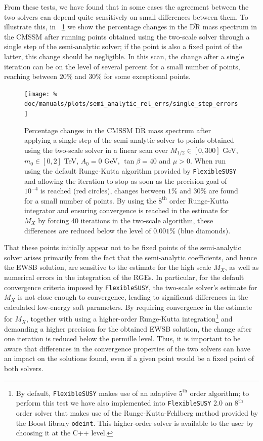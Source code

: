 \documentclass[final,3p,11pt,pdflatex]{elsarticle}
\makeatletter
\newcommand{\fs}{\texttt{FlexibleSUSY}\@\xspace}
\newcommand{\fstwo}{\fs 2.0\@\xspace}
\newcommand{\ol}[1]{\overline{#1}}
\newcommand{\DRbar}{\ensuremath{\ol{\text{DR}}}\xspace}
\newcommand{\figref}[1]{\figurename~\ref{#1}}
\newcommand{\azero}{\ensuremath{A_0}\xspace}
\newcommand{\mhalf}{\ensuremath{M_{1/2}}\xspace}
\newcommand{\mzero}{\ensuremath{m_0}\xspace}
\makeatother
\begin{document}
From these tests, we have found that in some cases the agreement
between the two solvers can depend quite sensitively on small differences
between them.  To illustrate this, in \figref{fig:semi_analytic_differences}
we show the percentage changes in the \DRbar mass spectrum in the CMSSM after
running points obtained using the two-scale solver through a single step of
the semi-analytic solver; if the point is also a fixed point of the latter,
this change should be negligible.  In this
scan, the change after a single iteration can be on the level of several
percent for a small number of points, reaching between $20$\% and $30$\% for
some exceptional points.
%
\begin{figure}[tbh]
  \centering
  \texttt{[image: \%
    doc/manuals/plots/semi\_analytic\_rel\_errs/single\_step\_errors]}
  \caption{Percentage changes in the CMSSM \DRbar mass spectrum after
    applying a single step of the semi-analytic solver to points obtained
    using the two-scale solver in a linear scan over $\mhalf \in
    [0,300]$ GeV, $\mzero \in [0,2]$ TeV, $\azero = 0$ GeV, $\tan\beta = 40$ and
    $\mu > 0$.  When run using the default Runge-Kutta algorithm provided
    by \fs and allowing the iteration to stop as soon as the precision goal of
    $10^{-4}$ is reached (red circles), changes between $1$\% and $30$\% are
    found for a small number of points.  By using the $8^{\text{th}}$ order
    Runge-Kutta integrator and ensuring convergence is reached in the
    estimate for $M_X$ by forcing 40 iterations in the two-scale algorithm,
    these differences are reduced below the level of $0.001$\% (blue
    diamonds).}
  \label{fig:semi_analytic_differences}
\end{figure}
%
That these points initially appear not to be fixed points of the semi-analytic
solver arises primarily from the fact that the semi-analytic coefficients,
and hence the EWSB solution, are sensitive to the estimate for the
high scale $M_X$, as well as numerical errors in the integration of the RGEs.
In particular, for the default convergence criteria imposed by \fs, the
two-scale solver's estimate for $M_X$ is not close enough to convergence,
leading to significant differences in the calculated low-energy soft
parameters.  By requiring convergence in the estimate for $M_X$, together with
using a higher-order Runge-Kutta integration\footnote{By default, \fs makes
  use of an adaptive $5^{\text{th}}$ order algorithm; to perform this test we
  have also implemented into \fstwo an $8^{\text{th}}$ order solver that makes
  use of the Runge-Kutta-Fehlberg method provided by the Boost library
  \texttt{odeint}.  This higher-order solver is available to the user by
  choosing it at the C++ level.} and demanding a higher precision for the
obtained EWSB solution, the change after one iteration is reduced below the
permille level.  Thus, it is important to be aware that differences in the
convergence properties of the two solvers can have an impact on the solutions
found, even if a given point would be a fixed point of both solvers.
\end{document}
